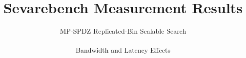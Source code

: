 \title{Sevarebench Measurement Results}
\subtitle{MP-SPDZ Replicated-Bin Scalable Search\\ \hfill \\
Bandwidth and Latency Effects}


	\frame {
		\titlepage
	}

    
    
    
    
    
    
    

    
    
    
    

    